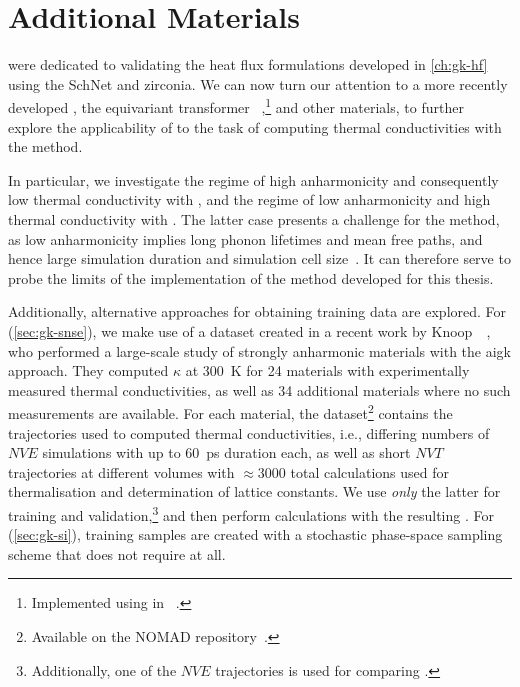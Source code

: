 
\chapter{Additional Materials}
\label{ch:gk-out}

 were dedicated to validating the heat flux formulations developed in \cref{ch:gk-hf} using the SchNet \mpnn and zirconia.
We can now turn our attention to a more recently developed \glp, the equivariant transformer \sok~\cite{fum2022q},\footnote{Implemented using \jax in \mlff~\cite{mlff}.} and other materials, to further explore the applicability of \glps to the task of computing thermal conductivities with the \gk method.

In particular, we investigate the regime of high anharmonicity and consequently low thermal conductivity with , and the regime of low anharmonicity and high thermal conductivity with . The latter case presents a challenge for the \gk method, as low anharmonicity implies long phonon lifetimes and mean free paths, and hence large simulation duration and simulation cell size~\cite{mjnc2011t,hsdg2012t}. It can therefore serve to probe the limits of the implementation of the \gk method developed for this thesis.

Additionally, alternative approaches for obtaining training data are explored. 
For  (\cref{sec:gk-snse}), we make use of a dataset created in a recent work by Knoop~\etal~\cite{kpsc2023t}, who performed a large-scale study of strongly anharmonic materials with the \gls{aigk} approach. They computed $\kappa$ at \qty{300}{K} for \num{24} materials with experimentally measured thermal conductivities, as well as \num{34} additional materials where no such measurements are available.
For each material, the dataset\footnote{Available on the NOMAD repository~\cite{kpsc2023t-data}.} contains the trajectories used to computed thermal conductivities, i.e., differing numbers of $NVE$ simulations with up to \qty{60}{ps} duration each, as well as short $NVT$ trajectories at different volumes with $\approx \num{3000}$ total calculations used for thermalisation and determination of lattice constants. 
We use \emph{only} the latter for training and validation,\footnote{Additionally, one of the $NVE$ trajectories is used for comparing \vdos.} and then perform \gk calculations with the resulting \glps.
For  (\cref{sec:gk-si}), training samples are created with a stochastic phase-space sampling scheme that does not require \aimd at all.

